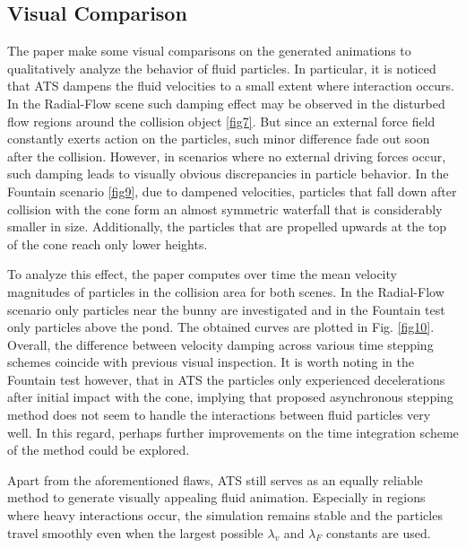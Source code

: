 \documentclass[
	11pt, 
	DIV10,
	ngerman,
	a4paper, 
	oneside, 
	headings=normal, 
	captions=tableheading,
	final, 
	numbers=noenddot
]{scrartcl}
\begin{document}
\subsection{Visual Comparison}
The paper make some visual comparisons on the generated animations to qualitatively analyze the behavior of fluid particles. In particular, it is noticed that ATS dampens the fluid velocities to a small extent where interaction occurs. In the Radial-Flow scene such damping effect may be observed in the disturbed flow regions around the collision object \ref{fig7}. But since an external force field constantly exerts action on the particles, such minor difference fade out soon after the collision. However, in scenarios where no external driving forces occur, such damping leads to visually obvious discrepancies in particle behavior. In the Fountain scenario \ref{fig9}, due to dampened velocities, particles that fall down after collision with the cone form an almost symmetric waterfall that is considerably smaller in size. Additionally, the particles that are propelled upwards at the top of the cone reach only lower heights.
\par
To analyze this effect, the paper computes over time the mean velocity magnitudes of particles in the collision area for both scenes. In the Radial-Flow scenario only particles near the bunny are investigated and in the Fountain test only particles above the pond. The obtained curves are plotted in Fig. \ref{fig10}. Overall, the difference between velocity damping across various time stepping schemes coincide with previous visual inspection. It is worth noting in the Fountain test however, that in ATS the particles only experienced decelerations after initial impact with the cone, implying that proposed asynchronous stepping method does not seem to handle the interactions between fluid particles very well. In this regard, perhaps further improvements on the time integration scheme of the method could be explored.
\par
Apart from the aforementioned flaws, ATS still serves as an equally reliable method to generate visually appealing fluid animation. Especially in regions where heavy interactions occur, the simulation remains stable and the particles travel smoothly even when the largest possible $ \lambda_{v} $ and $ \lambda_{F} $ constants are used.
\end{document}
